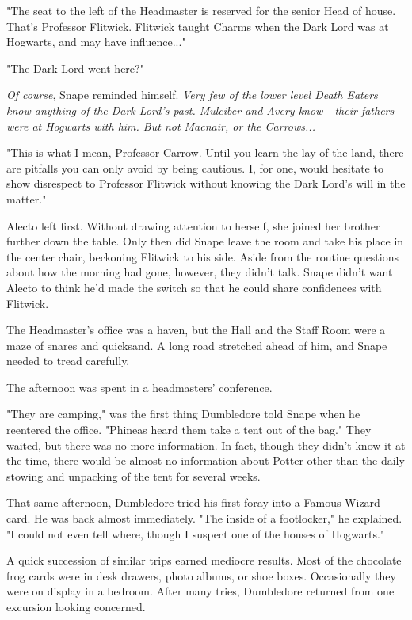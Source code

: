 \documentclass[a4paper,11pt]{article}
\begin{document}
"The seat to the left of the Headmaster is reserved for the senior Head of house. That's Professor Flitwick. Flitwick taught Charms when the Dark Lord was at Hogwarts, and may have influence..."

"The Dark Lord went here?"

\emph{Of course}, Snape reminded himself. \emph{Very few of the lower level Death Eaters know anything of the Dark Lord's past. Mulciber and Avery know - their fathers were at Hogwarts with him. But not Macnair, or the Carrows...}

"This is what I mean, Professor Carrow. Until you learn the lay of the land, there are pitfalls you can only avoid by being cautious. I, for one, would hesitate to show disrespect to Professor Flitwick without knowing the Dark Lord's will in the matter."

Alecto left first. Without drawing attention to herself, she joined her brother further down the table. Only then did Snape leave the room and take his place in the center chair, beckoning Flitwick to his side. Aside from the routine questions about how the morning had gone, however, they didn't talk. Snape didn't want Alecto to think he'd made the switch so that he could share confidences with Flitwick.

The Headmaster's office was a haven, but the Hall and the Staff Room were a maze of snares and quicksand. A long road stretched ahead of him, and Snape needed to tread carefully.

The afternoon was spent in a headmasters' conference.

"They are camping," was the first thing Dumbledore told Snape when he reentered the office. "Phineas heard them take a tent out of the bag." They waited, but there was no more information. In fact, though they didn't know it at the time, there would be almost no information about Potter other than the daily stowing and unpacking of the tent for several weeks.

That same afternoon, Dumbledore tried his first foray into a Famous Wizard card. He was back almost immediately. "The inside of a footlocker," he explained. "I could not even tell where, though I suspect one of the houses of Hogwarts."

A quick succession of similar trips earned mediocre results. Most of the chocolate frog cards were in desk drawers, photo albums, or shoe boxes. Occasionally they were on display in a bedroom. After many tries, Dumbledore returned from one excursion looking concerned.
\end{document}
